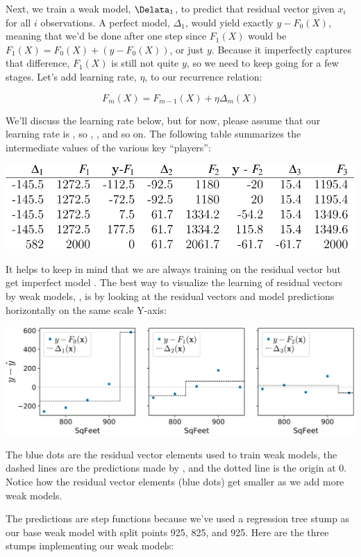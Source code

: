 \documentclass[]{book}
\theoremstyle{definition}
\theoremstyle{definition}
\theoremstyle{definition}
\theoremstyle{remark}
\begin{document}
Next, we train a weak model, \(\Delata_1\), to predict that residual
vector given \(x_i\) for all \(i\) observations. A perfect model,
\(\Delta_1\), would yield exactly \(y-F_0(X)\), meaning that we'd be
done after one step since \(F_1(X)\) would be
\(F_1(X) = F_0(X) + (y-F_0(X))\), or just \(y\). Because it imperfectly
captures that difference, \(F_1(X)\) is still not quite \(y\), so we
need to keep going for a few stages. Let's add learning rate, \(\eta\),
to our recurrence relation:

\[ F_m(X) = F_{m-1}(X) + \eta \Delta_m(X) \]

We'll discuss the learning rate below, but for now, please assume that
our learning rate is , so , , and so on. The following table summarizes
the intermediate values of the various key ``players'':

\includegraphics{figures/latex-65.svg}

It helps to keep in mind that we are always training on the residual
vector but get imperfect model . The best way to visualize the learning
of residual vectors by weak models, , is by looking at the residual
vectors and model predictions horizontally on the same scale Y-axis:

\includegraphics{figures/L2-loss_examples_4.svg}

The blue dots are the residual vector elements used to train weak
models, the dashed lines are the predictions made by , and the dotted
line is the origin at 0. Notice how the residual vector elements (blue
dots) get smaller as we add more weak models.

The predictions are step functions because we've used a regression tree
stump as our base weak model with split points 925, 825, and 925. Here
are the three stumps implementing our weak models:
\end{document}

